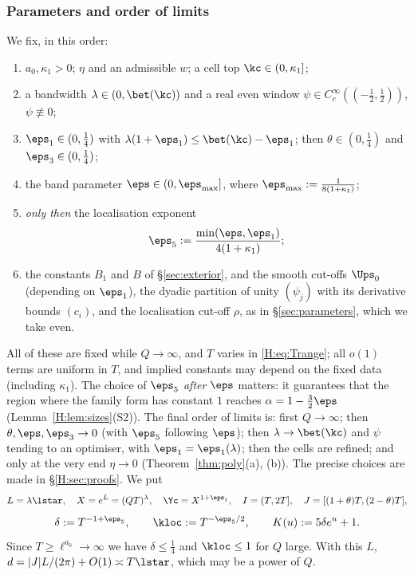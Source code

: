 \subsubsection*{Parameters and order of limits}\label{H:sec:parameters}
We fix, in this order:
\begin{enumerate}[label=(P\arabic*),leftmargin=*]
\item $a_0,\kappa_1>0$; $\eta$ and an admissible $w$; a cell top $\kc\in(0,\kappa_1]$;
\item a bandwidth $\lambda\in(0,\bet(\kc))$ and a real even window $\psi\in C_c^\infty((-\frac12,\frac12))$, $\psi\not\equiv0$;
\item $\eps_1\in(0,\frac14)$ with $\lambda(1+\eps_1)\le\bet(\kc)-\eps_1$; then $\theta\in(0,\frac14)$ and $\eps_3\in(0,\frac14)$;
\item the band parameter $\eps\in(0,\eps_{\max}]$, where $\eps_{\max}:=\frac1{8(1+\kappa_1)}$;
\item \emph{only then} the localisation exponent
\begin{equation}\label{H:eq:eps5}
\eps_5:=\frac{\min(\eps,\eps_1)}{4(1+\kappa_1)} ;
\end{equation}
\item the constants $B_1$ and $B$ of \S\ref{sec:exterior}, and the smooth cut-offs $\Ups_0$ (depending on $\eps_1$), the dyadic partition of unity $(\psi_j)$ with its derivative bounds $(c_i)$, and the localisation cut-off $\rho$, as in \S\ref{sec:parameters}, which we take even.
\end{enumerate}
All of these are fixed while $Q\to\infty$, and $T$ varies in \eqref{H:eq:Trange}; all $o(1)$ terms are uniform in $T$, and implied constants may depend on the fixed data (including $\kappa_1$). The choice of $\eps_5$ \emph{after} $\eps$ matters: it guarantees that the region where the family form has constant $1$ reaches $\alpha=1-\frac32\eps$ (Lemma~\ref{H:lem:sizes}(S2)). The final order of limits is: first $Q\to\infty$; then $\theta,\eps,\eps_3\to0$ (with $\eps_5$ following $\eps$); then $\lambda\to\bet(\kc)$ and $\psi$ tending to an optimiser, with $\eps_1=\eps_1(\lambda)$; then the cells are refined; and only at the very end $\eta\to0$ (Theorem~\ref{thm:poly}(a), (b)). The precise choices are made in \S\ref{H:sec:proofs}. We put
\begin{equation}\label{H:eq:basic}
L=\lambda\lstar,\quad X=e^L=(QT)^\lambda,\quad \Yc=X^{1+\eps_1},\quad I=(T,2T],\quad J=[(1+\theta)T,(2-\theta)T],
\end{equation}
\begin{equation}\label{H:eq:loc}
\delta:=T^{-1+\eps_5},\qquad \kloc:=T^{-\eps_5/2},\qquad K(u):=5\delta e^u+1 .
\end{equation}
Since $T\ge\ell^{a_0}\to\infty$ we have $\delta\le\frac14$ and $\kloc\le1$ for $Q$ large. With this $L$, $d=|J|L/(2\pi)+O(1)\asymp T\lstar$, which may be a power of $Q$.

